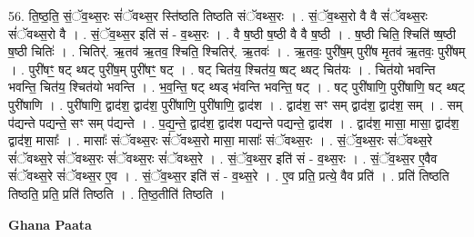 \documentclass[17pt]{extarticle}
\begin{document}
56. ति॒ष्ठ॒ति॒ सं॒ॅव॒थ्स॒रः सं॑ॅवथ्स॒र स्ति॑ष्ठति तिष्ठति संॅवथ्स॒रः । . सं॒ॅव॒थ्स॒रो वै वै सं॑ॅवथ्स॒रः सं॑ॅवथ्स॒रो वै । . सं॒ॅव॒थ्स॒र इति॑ सं - व॒थ्स॒रः । . वै ष॒ष्ठी ष॒ष्ठी वै वै ष॒ष्ठी । . ष॒ष्ठी चिति॒ श्चिति॑ ष्ष॒ष्ठी ष॒ष्ठी चितिः॑ । . चितिर्॑. ऋ॒तव॑ ऋ॒तव॒ श्चिति॒ श्चितिर्॑. ऋ॒तवः॑ । . ऋ॒तवः॒ पुरी॑ष॒म् पुरी॑ष मृ॒तव॑ ऋ॒तवः॒ पुरी॑षम् । . पुरी॑षꣳ॒॒ षट् थ्षट् पुरी॑ष॒म् पुरी॑षꣳ॒॒ षट् । . षट् चित॑य॒ श्चित॑य॒ ष्षट् थ्षट् चित॑यः । . चित॑यो भवन्ति भवन्ति॒ चित॑य॒ श्चित॑यो भवन्ति । . भ॒व॒न्ति॒ षट् थ्षड् भ॑वन्ति भवन्ति॒ षट् । . षट् पुरी॑षाणि॒ पुरी॑षाणि॒ षट् थ्षट् पुरी॑षाणि । . पुरी॑षाणि॒ द्वाद॑श॒ द्वाद॑श॒ पुरी॑षाणि॒ पुरी॑षाणि॒ द्वाद॑श । . द्वाद॑श॒ सꣳ सम् द्वाद॑श॒ द्वाद॑श॒ सम् । . सम् प॑द्यन्ते पद्यन्ते॒ सꣳ सम् प॑द्यन्ते । . प॒द्य॒न्ते॒ द्वाद॑श॒ द्वाद॑श पद्यन्ते पद्यन्ते॒ द्वाद॑श । . द्वाद॑श॒ मासा॒ मासा॒ द्वाद॑श॒ द्वाद॑श॒ मासाः᳚ । . मासाः᳚ संॅवथ्स॒रः सं॑ॅवथ्स॒रो मासा॒ मासाः᳚ संॅवथ्स॒रः । . सं॒ॅव॒थ्स॒रः सं॑ॅवथ्स॒रे सं॑ॅवथ्स॒रे सं॑ॅवथ्स॒रः सं॑ॅवथ्स॒रः सं॑ॅवथ्स॒रे । . सं॒ॅव॒थ्स॒र इति॑ सं - व॒थ्स॒रः । . सं॒ॅव॒थ्स॒र ए॒वैव सं॑ॅवथ्स॒रे सं॑ॅवथ्स॒र ए॒व । . सं॒ॅव॒थ्स॒र इति॑ सं - व॒थ्स॒रे । . ए॒व प्रति॒ प्रत्ये॒ वैव प्रति॑ । . प्रति॑ तिष्ठति तिष्ठति॒ प्रति॒ प्रति॑ तिष्ठति । . ति॒ष्ठ॒तीति॑ तिष्ठति । \newline

\textbf{Ghana Paata } \newline
\end{document}
